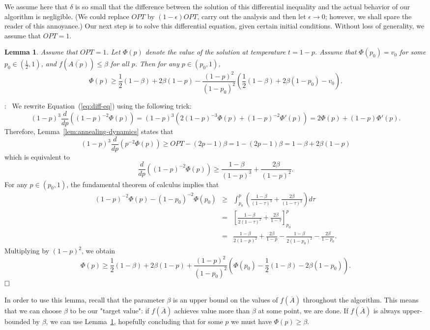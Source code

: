 \documentclass{article}[11pt]
\newtheorem{lemma}[theorem]{Lemma}
\renewenvironment{proof}{\noindent{\bf Proof}:~}{$\hfill \Box$\\}
\begin{document}
We assume here that $\delta$ is so small that the difference
between the solution of this differential inequality and the actual
behavior of our algorithm is negligible. 
(We could replace $OPT$ by $(1-\epsilon) OPT$, carry out the analysis
and then let $\epsilon \rightarrow 0$; however, we shall spare the reader of this annoyance.)
Our next step is to solve this differential equation, given certain initial conditions.
Without loss of generality, we assume that $OPT=1$.

\begin{lemma}
\label{lem:diff-solution}
Assume that $OPT=1$.
Let $\Phi(p)$ denote the value of the solution at temperature $t=1-p$.
Assume that $\Phi(p_0) = v_0$ for some $p_0 \in (\frac12,1)$, and $f(\overline{A(p)}) \leq \beta$
for all $p$. Then for any $p \in (p_0,1)$,
$$ \Phi(p) \geq \frac12 (1-\beta) + 2 \beta (1-p) -
 \frac{(1-p)^2}{(1-p_0)^2} \left(\frac12 (1-\beta) + 2 \beta (1-p_0) - v_0 \right).$$ 
\end{lemma}

\begin{proof}
We rewrite Equation~(\ref{eq:diff-eq}) using the following trick:
$$ (1-p)^3 \frac{d}{dp}((1-p)^{-2} \Phi(p)) = (1-p)^3 (2 (1-p)^{-3} \Phi(p) + (1-p)^{-2} \Phi'(p))
 = 2 \Phi(p) + (1-p) \Phi'(p).$$
Therefore, Lemma~\ref{lem:annealing-dynamics} states that
$$ (1-p)^3 \frac{d}{dp}(p^{-2} \Phi(p)) \geq OPT - (2p-1) \beta 
= 1 - (2p-1) \beta = 1-\beta + 2 \beta (1-p) $$
which is equivalent to
$$ \frac{d}{dp}((1-p)^{-2} \Phi(p)) \geq \frac{1-\beta}{(1-p)^3} + \frac{2 \beta}{(1-p)^2}.$$
For any $p \in (p_0,1)$, the fundamental theorem of calculus implies that
\begin{eqnarray*}
(1-p)^{-2} \Phi(p) - (1-p_0)^{-2} \Phi(p_0)
 & \geq & \int_{p_0}^{p} \left( \frac{1-\beta}{(1-\tau)^3} + \frac{2 \beta}{(1-\tau)^2} \right) d\tau
 \\
& = & \left[ \frac{1-\beta}{2 (1-\tau)^2} + \frac{2 \beta}{1-\tau} \right]_{p_0}^p \\
& = & \frac{1-\beta}{2(1-p)^2} + \frac{2 \beta}{1-p} - \frac{1-\beta}{2(1-p_0)^2} - \frac{2 \beta}{1-p_0}.
\end{eqnarray*}
Multiplying by $(1-p)^2$, we obtain
$$ \Phi(p) \geq \frac12 (1-\beta) + 2 \beta (1-p) +
 \frac{(1-p)^2}{(1-p_0)^2} \left(\Phi(p_0) - \frac12(1-\beta) - 2 \beta (1-p_0) \right).$$
\end{proof}

In order to use this lemma,
recall that the parameter $\beta$ is an upper bound on the values of $f(\overline{A})$ throughout
the algorithm. This means that we can choose $\beta$ to be our "target value":
if $f(\overline{A})$ achieves value more than $\beta$ at some point, we are done.
If $f(\overline{A})$ is always upper-bounded by $\beta$, we can use Lemma~\ref{lem:diff-solution},
hopefully concluding that for some $p$ we must have $\Phi(p) \geq \beta$.
\end{document}
